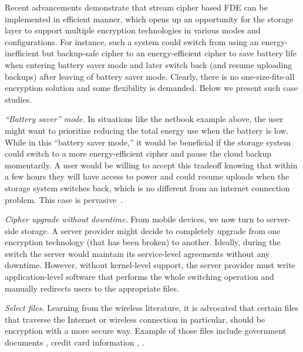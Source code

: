 Recent advancements demonstrate that stream cipher based FDE can be implemented
in efficient manner, which opens up an opportunity for the storage layer to
support multiple encryption technologies in various modes and configurations.
For instance, such a system could switch from using an energy-inefficient but
backup-safe cipher to an energy-efficient cipher to save battery life when
entering battery saver mode and later switch back (and resume uploading backups)
after leaving of battery saver mode. Clearly, there is no one-size-fits-all
encryption solution and some flexibility is demanded. Below we present \numCases
such case studies.

{\em ``Battery saver'' mode.} In situations like the netbook example above, the
user might want to prioritize reducing the total energy use when the battery is
low. While in this ``battery saver mode,'' it would be beneficial if the storage
system could switch to a more energy-efficient cipher and pause the cloud backup
momentarily. A user would be willing to accept this tradeoff knowing that within
a few hours they will have access to power and could resume uploads when the
storage system switches back, which is no different from an internet connection
problem. This case is pervasive~\cite{battery-saver1, battery-saver2,
battery-saver3, battery-saver4, battery-saver5}.

{\em Cipher upgrade without downtime.} From mobile devices, we now turn to
server-side storage. A server provider might decide to completely upgrade from
one encryption technology (\eg that has been broken) to another. Ideally, during
the switch the server would maintain its service-level agreements without any
downtime. However, without kernel-level support, the server provider must write
application-level software that performs the whole switching operation and
manually redirects users to the appropriate files.

{\em Select files.} Learning from the wireless literature, it is advocated that
certain files that traverse the Internet or wireless connection in particular,
should be encryption with a more secure way. Example of those files include
government documents \cite{citation-to-this-example}, credit card information
\cite{a}, \xxx \cite{a, b, c}.
